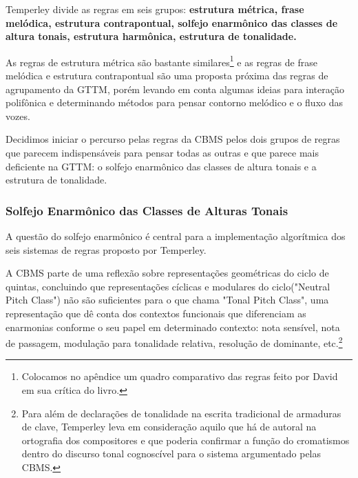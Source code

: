 \documentclass[
	12pt,				%
	openright,			%
	twoside,			%
	a4paper,			%
	english,			%
	french,				%
	spanish,			%
	brazil				%
	]{abntex2}
\begin{document}
Temperley divide as regras em seis grupos: \textbf{estrutura métrica, frase melódica, estrutura contrapontual, solfejo enarmônico das classes de altura tonais, estrutura harmônica, estrutura de tonalidade.}

As regras de estrutura métrica são bastante similares\footnote{Colocamos no apêndice um quadro comparativo das regras feito por David  em sua crítica do livro.  } e as regras de frase melódica e estrutura contrapontual são uma proposta próxima das regras de agrupamento da GTTM, porém levando em conta algumas ideias para interação polifônica e determinando métodos para pensar contorno melódico e o fluxo das vozes. 

Decidimos iniciar o percurso pelas regras da CBMS pelos dois grupos de regras que parecem indispensáveis para pensar todas as outras e que parece mais deficiente na GTTM: o solfejo enarmônico das classes de altura tonais e a estrutura de tonalidade. 


\subsubsection{Solfejo Enarmônico das Classes de Alturas Tonais}
\label{solfejo}
A questão do solfejo enarmônico é central para a implementação algorítmica dos seis sistemas de regras proposto por Temperley.

A CBMS parte de uma reflexão sobre representações geométricas do ciclo de quintas, concluindo que representações cíclicas e modulares do ciclo("Neutral Pitch Class") não são suficientes para o que chama "Tonal Pitch Class", uma representação que dê conta dos contextos funcionais que diferenciam as enarmonias conforme o seu papel em determinado contexto: nota sensível, nota de passagem, modulação para tonalidade relativa, resolução de dominante, etc.\footnote{Para além de declarações de tonalidade na escrita tradicional de armaduras de clave, Temperley leva em consideração aquilo que há de autoral na ortografia\cite[p.123]{temperley2001cognition}  dos compositores e que poderia confirmar a função do cromatismos dentro do discurso tonal cognoscível para o sistema argumentado pelas CBMS.}
\end{document}
